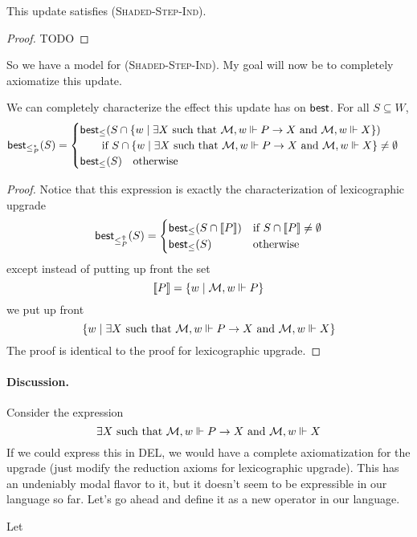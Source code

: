 \documentclass[letterpaper]{article}
\begin{document}
\begin{theorem}
    This update satisfies \textsc{(Shaded-Step-Ind)}.
\end{theorem}
\begin{proof}
    TODO
\end{proof}

So we have a model for \textsc{(Shaded-Step-Ind)}. My goal will now be to completely axiomatize this update.

\begin{proposition}
    We can completely characterize the effect this update has on $\mathsf{best}$.  For all $S \subseteq W$,
    \[
        \mathsf{best}_{\leq^\star_P}(S) =
        \begin{cases}
             \mathsf{best}_\leq(S \cap \{ w \mid \exists X \mbox{ such that } \mathcal{M}, w \Vdash P \to X \mbox{ and } \mathcal{M}, w \Vdash X \})\\
             \quad \quad \mbox{if } S \cap \{ w \mid \exists X \mbox{ such that } \mathcal{M}, w \Vdash P \to X \mbox{ and } \mathcal{M}, w \Vdash X \} \ne \emptyset\\
            \mathsf{best}_\leq(S) \quad \mbox{otherwise}
        \end{cases}
    \]
\end{proposition}
\begin{proof}
    Notice that this expression is exactly the characterization of lexicographic upgrade
    \[  \mathsf{best}_{\leq^\Uparrow_P}(S) = 
        \begin{cases}
            \mathsf{best}_\leq(S \cap [\![\mbox{\em $ P $\/}]\!]) & \mbox{if } S \cap [\![\mbox{\em $ P $\/}]\!] \ne \emptyset\\
            \mathsf{best}_\leq(S) & \mbox{otherwise}
        \end{cases}
    \]
    except instead of putting up front the set
    \[
        [\![\mbox{\em $ P $\/}]\!] = \{ w \mid \mathcal{M}, w \Vdash P \}
    \]
    we put up front
    \[
        \{ w \mid \exists X \mbox{ such that } \mathcal{M}, w \Vdash P \to X \mbox{ and } \mathcal{M}, w \Vdash X \}
    \]
    The proof is identical to the proof for lexicographic upgrade.
\end{proof}

\paragraph*{Discussion.} Consider the expression
\[
    \exists X \mbox{ such that } \mathcal{M}, w \Vdash P \to X \mbox{ and } \mathcal{M}, w \Vdash X
\]
If we could express this in DEL, we would have a complete axiomatization for the upgrade (just modify the reduction axioms for lexicographic upgrade).  This has an undeniably modal flavor to it, but it doesn't seem to be expressible in our language so far.  Let's go ahead and define it as a new operator in our language.

\begin{definition}
    Let \spiral
\end{definition}

\printbibliography
\end{document}
